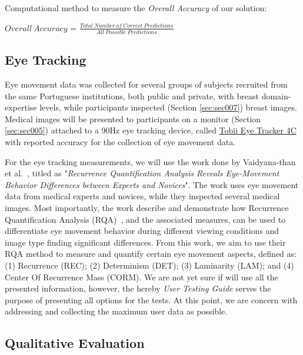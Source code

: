 \hfill

Computational method to measure the {\it Overall Accuracy} of our solution:

\hfill

\begin{Form}
\Large
\begin{center}
$Overall~Accuracy$ = $\frac{Total~Number~of~Correct~Predictions}{All~Possible~Predictions}$
\end{center}
\end{Form}

\hfill

\subsection{Eye Tracking}

Eye movement data was collected for several groups of subjects recruited from the same Portuguese institutions, both public and private, with breast domain-expertise levels, while participants inspected (Section \ref{sec:sec007}) breast images. Medical images will be presented to participants on a monitor (Section \ref{sec:sec005}) attached to a 90Hz eye tracking device, called \hyperlink{https://gaming.tobii.com/product/tobii-eye-tracker-4c/}{Tobii Eye Tracker 4C} with reported accuracy for the collection of eye movement data.

For the eye tracking measurements, we will use the work done by Vaidyana-than et al.~\cite{vaidyanathan2014recurrence}, titled as "{\it Recurrence Quantification Analysis Reveals Eye-Movement Behavior Differences between Experts and Novices}". The work uses eye movement data from medical experts and novices, while they inspected several medical images. Most importantly, the work describe and demonstrate how Recurrence Quantification Analysis (RQA)~\cite{anderson2013recurrence}, and the associated measures, can be used to differentiate eye movement behavior during different viewing conditions and image type finding significant differences. From this work, we aim to use their RQA method to measure and quantify certain eye movement aspects, defined as: (1) Recurrence (REC); (2) Determinism (DET); (3) Laminarity (LAM); and (4) Center Of Recurrence Mass (CORM). We are not yet sure if will use all the presented information, however, the hereby {\it User Testing Guide} serves the purpose of presenting all options for the tests. At this point, we are concern with addressing and collecting the maximum user data as possible.

\subsection{Qualitative Evaluation}


